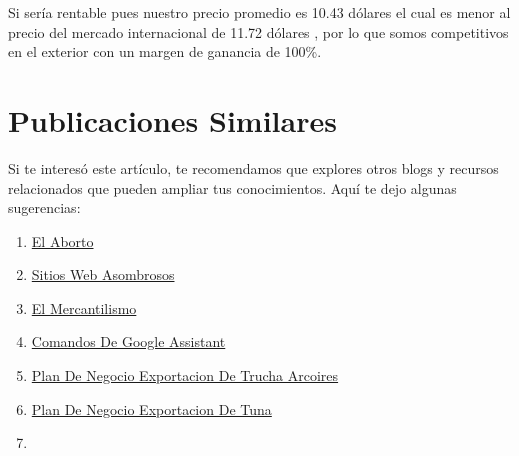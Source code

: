 \documentclass[
  stu,
  floatsintext,
  longtable,
  a4paper,
  nolmodern,
  notxfonts,
  notimes,
  colorlinks=true,linkcolor=blue,citecolor=blue,urlcolor=blue]{apa7}
\providecommand{\tightlist}{%
  \setlength{\itemsep}{0pt}\setlength{\parskip}{0pt}}
\begin{document}
Si sería rentable pues nuestro precio promedio es 10.43 dólares el cual
es menor al precio del mercado internacional de 11.72 dólares , por lo
que somos competitivos en el exterior con un margen de ganancia de
100\%.

\section{Publicaciones Similares}\label{publicaciones-similares}

Si te interesó este artículo, te recomendamos que explores otros blogs y
recursos relacionados que pueden ampliar tus conocimientos. Aquí te dejo
algunas sugerencias:

\begin{enumerate}
\def\labelenumi{\arabic{enumi}.}
\tightlist
\item
  \href{https://achalmaedison.netlify.app/blog/posts/2015-05-14-el-aborto/index.pdf}{}
  \href{https://achalmaedison.netlify.app/blog/posts/2015-05-14-el-aborto}{El
  Aborto}
\item
  \href{https://achalmaedison.netlify.app/blog/posts/2017-04-23-sitios-web-asombrosos/index.pdf}{}
  \href{https://achalmaedison.netlify.app/blog/posts/2017-04-23-sitios-web-asombrosos}{Sitios
  Web Asombrosos}
\item
  \href{https://achalmaedison.netlify.app/blog/posts/2017-05-23-el-mercantilismo/index.pdf}{}
  \href{https://achalmaedison.netlify.app/blog/posts/2017-05-23-el-mercantilismo}{El
  Mercantilismo}
\item
  \href{https://achalmaedison.netlify.app/blog/posts/2020-05-23-comandos-de-google-assistant/index.pdf}{}
  \href{https://achalmaedison.netlify.app/blog/posts/2020-05-23-comandos-de-google-assistant}{Comandos
  De Google Assistant}
\item
  \href{https://achalmaedison.netlify.app/blog/posts/2020-09-15-plan-de-negocio-exportacion-de-trucha-arcoires/index.pdf}{}
  \href{https://achalmaedison.netlify.app/blog/posts/2020-09-15-plan-de-negocio-exportacion-de-trucha-arcoires}{Plan
  De Negocio Exportacion De Trucha Arcoires}
\item
  \href{https://achalmaedison.netlify.app/blog/posts/2021-07-13-plan-de-negocio-exportacion-de-tuna/index.pdf}{}
  \href{https://achalmaedison.netlify.app/blog/posts/2021-07-13-plan-de-negocio-exportacion-de-tuna}{Plan
  De Negocio Exportacion De Tuna}
\item

\end{enumerate}
\end{document}
